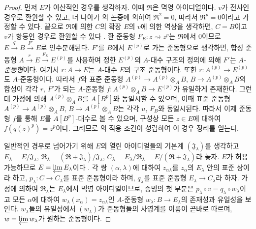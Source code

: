 \begin{proof}
먼저 $E$가 이산적인 경우를 생각하자. 이때 $\mathfrak R$은 멱영
아이디얼이다. $v$가 전사인 경우로 환원할 수 있고, 더 나아가
의 논증에 의하여 $\mathfrak R^2=0$, 따라서
$\mathfrak R^p=0$이라고 가정할 수 있다. 끝으로 $\mathfrak R$에 의한
$C$의 확장 $E$의 $v$에 의한 역상을 생각하면, $C=B$이고 $v$가
항등인 경우로 환원할 수 있다 .
환 준동형 $F_E:z\rightsquigarrow z^p$는 $\mathfrak R$에서 $0$이므로
$E\xrightarrow q B\xrightarrow{F'}E$로 인수분해된다. $F'$를 $B$에서
$E^{(p)}$로 가는 준동형으로 생각하면, 합성 준동형
$A\xrightarrow r E\xrightarrow{F_E}E^{(p)}$를 사용하여 정한 $E^{(p)}$의
$A$-대수 구조의 정의에 의해 $F'$는 \emph{$A$-준동형}이다. 여기서
$r:A\to E$는 $A$-대수 $E$의 구조 준동형이다. 또한
$r:A^{(p)}\to E^{(p)}$도 $A$-준동형이다. 따라서 $f$와 표준 준동형
$A^{(p)}\to A^{(p)}\otimes_A B$, $B\to A^{(p)}\otimes_A B$의 합성이
각각 $r$, $F'$가 되는 $A$-준동형 $f:A^{(p)}\otimes_A B\to E^{(p)}$가
유일하게 존재한다. 그런데 가정에 의해 $A^{(p)}\otimes_A B$를
$A[B^p]$와 동일시할 수 있으며, 이때 표준 준동형
$A^{(p)}\to A^{(p)}\otimes_A B$, $B\to A^{(p)}\otimes_A B$는 각각
$u$, $F_B$와 동일시된다. 따라서 이제 준동형 $f$를 통해 $E$를
$A[B^p]$-대수로 볼 수 있으며, 구성상 모든 $z\in E$에 대하여
$f(q(z)^p)=z^p$이다. 그러므로 의 적용 조건이
성립하여 이 경우 정리를 얻는다.

일반적인 경우로 넘어가기 위해 $E$의 열린 아이디얼들의 기본계
$(\mathfrak J_\lambda)$를 생각하고
$E_\lambda=E/\mathfrak J_\lambda$,
$\mathfrak R_\lambda=(\mathfrak R+\mathfrak J_\lambda)/\mathfrak J_\lambda$,
$C_\lambda=E_\lambda/\mathfrak R_\lambda=E/(\mathfrak R+\mathfrak J_\lambda)$라
놓자. $E$가 허용가능하므로 $E=\varprojlim E_\lambda$이다
. 각 쌍 $(\alpha,\lambda)$에 대하여
$z_{\alpha\lambda}$를 $z_\alpha$의 $E_\lambda$ 안의 표준 상이라 하고,
$p_\lambda:C\to C_\lambda$를 표준 준동형이라 하며,
$q_\lambda$를 표준 준동형 $E_\lambda\to C_\lambda$라 하자.
가정에 의하여 $\mathfrak R_\lambda$는 $E_\lambda$에서 멱영 아이디얼이므로,
증명의 첫 부분은 $p_\lambda\circ v=q_\lambda\circ w_\lambda$이고 모든
$\alpha$에 대하여 $w_\lambda(x_\alpha)=z_{\alpha\lambda}$인
$A$-준동형 $w_\lambda:B\to E_\lambda$의 존재성과 유일성을 보인다.
$w_\lambda$들의 유일성에서 $(w_\lambda)$가 준동형들의 사영계를 이룸이
곧바로 따르며, $w=\varprojlim w_\lambda$가 원하는 준동형이다.
\end{proof}

